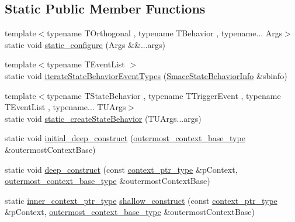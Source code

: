 \subsection*{Static Public Member Functions}
\begin{DoxyCompactItemize}
\item 
{\footnotesize template$<$typename T\+Orthogonal , typename T\+Behavior , typename... Args$>$ }\\static void \hyperlink{classsmacc_1_1SmaccState_a3e335f3290e4968db0c8e22bf88356b7}{static\+\_\+configure} (Args \&\&...args)
\item 
{\footnotesize template$<$typename T\+Event\+List $>$ }\\static void \hyperlink{classsmacc_1_1SmaccState_a9deac4c991e25df847af4c1882dbe71a}{iterate\+State\+Behavior\+Event\+Types} (\hyperlink{structsmacc_1_1introspection_1_1SmaccStateBehaviorInfo}{Smacc\+State\+Behavior\+Info} \&sbinfo)
\item 
{\footnotesize template$<$typename T\+State\+Behavior , typename T\+Trigger\+Event , typename T\+Event\+List , typename... T\+U\+Args$>$ }\\static void \hyperlink{classsmacc_1_1SmaccState_a827c90e9c0b1791f6ee26f1f074231e4}{static\+\_\+create\+State\+Behavior} (T\+U\+Args...\+args)
\item 
static void \hyperlink{classsmacc_1_1SmaccState_af4b4635d16a32bdd3956e5d40ddbd01d}{initial\+\_\+deep\+\_\+construct} (\hyperlink{classsmacc_1_1SmaccState_aaf76bbe2aa9dd73e3284605f84ab4b16}{outermost\+\_\+context\+\_\+base\+\_\+type} \&outermost\+Context\+Base)
\item 
static void \hyperlink{classsmacc_1_1SmaccState_aac23d8a6909f75c5e5fca2a7c09b5368}{deep\+\_\+construct} (const \hyperlink{classsmacc_1_1SmaccState_a0e15b77514301039f6bc093a9d3f6425}{context\+\_\+ptr\+\_\+type} \&p\+Context, \hyperlink{classsmacc_1_1SmaccState_aaf76bbe2aa9dd73e3284605f84ab4b16}{outermost\+\_\+context\+\_\+base\+\_\+type} \&outermost\+Context\+Base)
\item 
static \hyperlink{classsmacc_1_1SmaccState_a65a772c2e2039e9a59148ba6ffb54d8a}{inner\+\_\+context\+\_\+ptr\+\_\+type} \hyperlink{classsmacc_1_1SmaccState_a1dccb401e1a99031863a21a590d953e6}{shallow\+\_\+construct} (const \hyperlink{classsmacc_1_1SmaccState_a0e15b77514301039f6bc093a9d3f6425}{context\+\_\+ptr\+\_\+type} \&p\+Context, \hyperlink{classsmacc_1_1SmaccState_aaf76bbe2aa9dd73e3284605f84ab4b16}{outermost\+\_\+context\+\_\+base\+\_\+type} \&outermost\+Context\+Base)
\end{DoxyCompactItemize}
